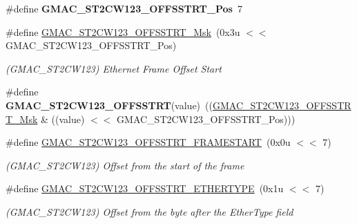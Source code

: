 \begin{DoxyCompactItemize}
\item 
\mbox{\label{group__SAMV71__GMAC_ga736b88e34cc5308ce868655f193adc08}} 
\#define {\bfseries G\+M\+A\+C\+\_\+\+S\+T2\+C\+W123\+\_\+\+O\+F\+F\+S\+S\+T\+R\+T\+\_\+\+Pos}~7
\item 
\mbox{\label{group__SAMV71__GMAC_gafe459e560a300a977172a99bedf8fb45}} 
\#define \mbox{\hyperlink{group__SAMV71__GMAC_gafe459e560a300a977172a99bedf8fb45}{G\+M\+A\+C\+\_\+\+S\+T2\+C\+W123\+\_\+\+O\+F\+F\+S\+S\+T\+R\+T\+\_\+\+Msk}}~(0x3u $<$$<$ G\+M\+A\+C\+\_\+\+S\+T2\+C\+W123\+\_\+\+O\+F\+F\+S\+S\+T\+R\+T\+\_\+\+Pos)
\begin{DoxyCompactList}\small\item\em (G\+M\+A\+C\+\_\+\+S\+T2\+C\+W123) Ethernet Frame Offset Start \end{DoxyCompactList}\item 
\mbox{\label{group__SAMV71__GMAC_ga213539f942f8015b57ebffbc4cca0e52}} 
\#define {\bfseries G\+M\+A\+C\+\_\+\+S\+T2\+C\+W123\+\_\+\+O\+F\+F\+S\+S\+T\+RT}(value)~((\mbox{\hyperlink{group__SAMV71__GMAC_gafe459e560a300a977172a99bedf8fb45}{G\+M\+A\+C\+\_\+\+S\+T2\+C\+W123\+\_\+\+O\+F\+F\+S\+S\+T\+R\+T\+\_\+\+Msk}} \& ((value) $<$$<$ G\+M\+A\+C\+\_\+\+S\+T2\+C\+W123\+\_\+\+O\+F\+F\+S\+S\+T\+R\+T\+\_\+\+Pos)))
\item 
\mbox{\label{group__SAMV71__GMAC_ga9ae223e0b7c52583ad35f2ae9942fe6e}} 
\#define \mbox{\hyperlink{group__SAMV71__GMAC_ga9ae223e0b7c52583ad35f2ae9942fe6e}{G\+M\+A\+C\+\_\+\+S\+T2\+C\+W123\+\_\+\+O\+F\+F\+S\+S\+T\+R\+T\+\_\+\+F\+R\+A\+M\+E\+S\+T\+A\+RT}}~(0x0u $<$$<$ 7)
\begin{DoxyCompactList}\small\item\em (G\+M\+A\+C\+\_\+\+S\+T2\+C\+W123) Offset from the start of the frame \end{DoxyCompactList}\item 
\mbox{\label{group__SAMV71__GMAC_gaf12297b70a1840c02e924224088fcbc0}} 
\#define \mbox{\hyperlink{group__SAMV71__GMAC_gaf12297b70a1840c02e924224088fcbc0}{G\+M\+A\+C\+\_\+\+S\+T2\+C\+W123\+\_\+\+O\+F\+F\+S\+S\+T\+R\+T\+\_\+\+E\+T\+H\+E\+R\+T\+Y\+PE}}~(0x1u $<$$<$ 7)
\begin{DoxyCompactList}\small\item\em (G\+M\+A\+C\+\_\+\+S\+T2\+C\+W123) Offset from the byte after the Ether\+Type field \end{DoxyCompactList}\item 

\end{DoxyCompactItemize}
